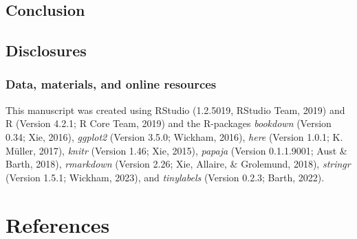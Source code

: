 \documentclass[
  ,man,mask,floatsintext]{apa6}
\begin{document}
\hypertarget{conclusion}{%
\subsection{Conclusion}\label{conclusion}}

\hypertarget{disclosures}{%
\subsection{Disclosures}\label{disclosures}}

\hypertarget{data-materials-and-online-resources}{%
\subsubsection{Data, materials, and online resources}\label{data-materials-and-online-resources}}

This manuscript was created using RStudio (1.2.5019, RStudio Team, 2019) and R (Version 4.2.1; R Core Team, 2019) and the R-packages \emph{bookdown} (Version 0.34; Xie, 2016), \emph{ggplot2} (Version 3.5.0; Wickham, 2016), \emph{here} (Version 1.0.1; K. Müller, 2017), \emph{knitr} (Version 1.46; Xie, 2015), \emph{papaja} (Version 0.1.1.9001; Aust \& Barth, 2018), \emph{rmarkdown} (Version 2.26; Xie, Allaire, \& Grolemund, 2018), \emph{stringr} (Version 1.5.1; Wickham, 2023), and \emph{tinylabels} (Version 0.2.3; Barth, 2022).

\hypertarget{references}{%
\section{References}\label{references}}

\setlength{\parindent}{-0.2in}
\setlength{\leftskip}{0.2in}
\end{document}

